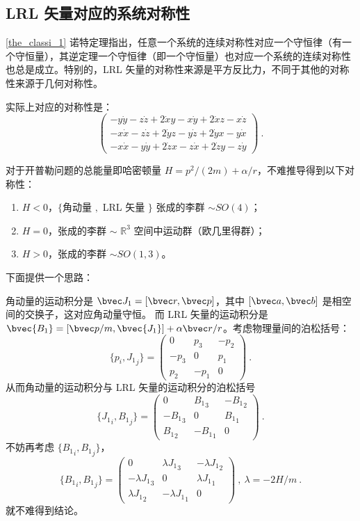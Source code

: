 \subsection{LRL 矢量对应的系统对称性}
\autoref{the_classi_1}  诺特定理指出，任意一个系统的连续对称性对应一个守恒律（有一个守恒量），其逆定理一个守恒律（即一个守恒量）也对应一个系统的连续对称性也总是成立。特别的，LRL 矢量的对称性来源是平方反比力，不同于其他的对称性来源于几何对称性。

实际上对应的对称性是：
\begin{equation}
\begin{pmatrix}
-y\dot y-z\dot z+2\dot x y -x \dot y +2\dot x z-x\dot z \\
-x \dot x - z \dot z + 2 \dot y z - y \dot z + 2 \dot y x - y \dot x \\
-x \dot x - y \dot y + 2 \dot z x - z \dot x + 2 \dot z y - z \dot y 
\end{pmatrix} ~.
\end{equation}

对于开普勒问题的总能量即哈密顿量 $H = p^2/(2m) + \alpha/r$，不难推导得到以下对称性：
\begin{enumerate}
\item $H < 0$，$\{$角动量 $,$ LRL 矢量 $\}$ 张成的李群 $\sim SO(4)$；
\item $H = 0 $，张成的李群 $\sim$ $\mathbb R^3$ 空间中运动群（欧几里得群）；
\item $H > 0$，张成的李群 $\sim SO(1, 3)$。
\end{enumerate}
下面提供一个思路：

角动量的运动积分是 $\bvec J_1 = [\bvec r, \bvec p]$，其中 $[\bvec a, \bvec b]$ 是相空间的交换子，这对应角动量守恒。
而 LRL 矢量的运动积分是 $\bvec{B_1} = [\bvec p/m, \bvec{J_1}] + \alpha \bvec r / r$。考虑物理量间的泊松括号：
\begin{equation}
\{p_i, {J_1}_{j}\} = \begin{pmatrix}
0 & p_3 & -p_2 \\
-p_3 & 0 & p_1 \\
p_2 & -p_1 & 0
\end{pmatrix}~.
\end{equation}
从而角动量的运动积分与 LRL 矢量的运动积分的泊松括号
\begin{equation}
\{{J_1}_i, {B_1}_j\} = \begin{pmatrix}
0 & {B_1}_3 & -{B_1}_2 \\
-{B_1}_3 & 0 & {B_1}_1 \\
{B_1}_2 & -{B_1}_1 & 0 
\end{pmatrix} ~.
\end{equation}
不妨再考虑 $\{{B_1}_i, {B_1}_j\}$，
\begin{equation}
\{{B_1}_i, {B_1}_j\} = \begin{pmatrix}
0 & \lambda {J_1}_3 & -\lambda {J_1}_2 \\
-\lambda {J_1}_3 & 0 & \lambda {J_1}_1 \\
\lambda {J_1}_2 & -\lambda {J_1}_1 & 0 
\end{pmatrix}~,\ \lambda = -2H/m ~.
\end{equation}
就不难得到结论。